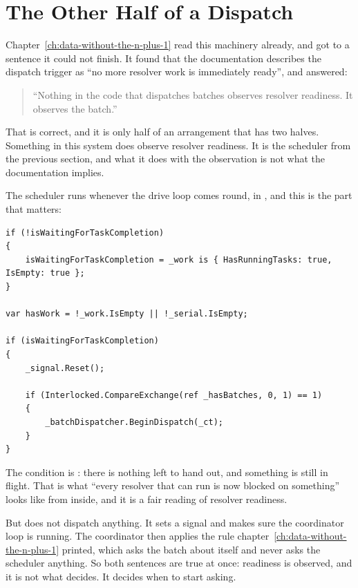 \section{The Other Half of a Dispatch}
\label{sec:ch16-when-a-batch-goes-out}

Chapter~\ref{ch:data-without-the-n-plus-1} read this machinery already, and got
to a sentence it could not finish. It found that the documentation describes the
dispatch trigger as \enquote{no more resolver work is immediately ready}, and
answered:

\begin{quote}
\enquote{Nothing in the code that dispatches batches observes resolver
readiness. It observes the batch.}
\end{quote}

That is correct, and it is only half of an arrangement that has two halves.
Something in this system does observe resolver readiness. It is the scheduler
from the previous section, and what it does with the observation is not what the
documentation implies.

%
The scheduler runs  whenever the drive loop
comes round, in , and this is the part that
matters:

\begin{verbatim}
if (!isWaitingForTaskCompletion)
{
    isWaitingForTaskCompletion = _work is { HasRunningTasks: true, IsEmpty: true };
}

var hasWork = !_work.IsEmpty || !_serial.IsEmpty;

if (isWaitingForTaskCompletion)
{
    _signal.Reset();

    if (Interlocked.CompareExchange(ref _hasBatches, 0, 1) == 1)
    {
        _batchDispatcher.BeginDispatch(_ct);
    }
}
\end{verbatim}

%
The condition is : there is nothing
left to hand out, and something is still in flight. That is what \enquote{every
resolver that can run is now blocked on something} looks like from inside, and
it is a fair reading of resolver readiness.

But  does not dispatch anything. It sets a signal and makes
sure the coordinator loop is running. The coordinator then applies the rule
chapter~\ref{ch:data-without-the-n-plus-1} printed, which asks the batch about
itself and never asks the scheduler anything. So both sentences are true at
once: readiness is observed, and it is not what decides. It decides when to
start asking.

